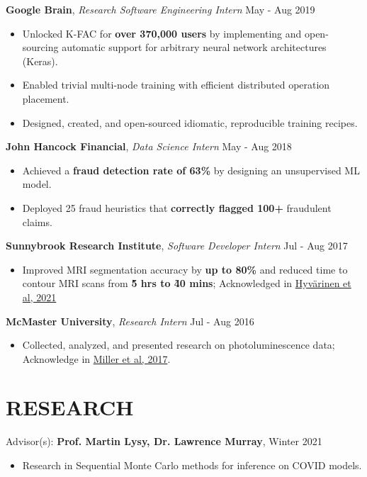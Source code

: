 \documentclass[line,margin]{res}
\newcommand{\experience}[3]{\textbf{#1}, \textit{#2} \hfill #3 \\ \vspace{-4mm}}
\newcommand{\ura}[3]{Advisor(s): \textbf{#1}, \textit{#2} \hfill #3 \\ \vspace{-4mm}}
\begin{document}
\begin{resume}
    \experience{Google Brain}{Research Software Engineering Intern}{May - Aug 2019}
    \begin{itemize}
        \item Unlocked K-FAC for \textbf{over 370,000 users} by implementing and open-sourcing automatic support for arbitrary neural network architectures (Keras).
        \item Enabled trivial multi-node training with efficient distributed operation placement.
        \item Designed, created, and open-sourced idiomatic, reproducible training recipes.
    \end{itemize}

    \experience{John Hancock Financial}{Data Science Intern}{May - Aug 2018}
    \begin{itemize}
        \item Achieved a \textbf{fraud detection rate of 63\%} by designing an unsupervised ML model.
        \item Deployed 25 fraud heuristics that \textbf{correctly flagged 100+} fraudulent claims.
    \end{itemize}

    \experience{Sunnybrook Research Institute}{Software Developer Intern}{Jul - Aug 2017}
    \begin{itemize}
        \item Improved MRI segmentation accuracy by \textbf{up to 80\%} and reduced time to contour MRI scans from \textbf{\~5 hrs to \~40 mins}; Acknowledged in \href{https://aapm.onlinelibrary.wiley.com/doi/epdf/10.1002/mp.15263}{Hyvärinen et al, 2021}
    \end{itemize}

    \experience{McMaster University}{Research Intern}{Jul - Aug 2016}
    \begin{itemize}
        \item Collected, analyzed, and presented research on photoluminescence data; Acknowledge in \href{https://www.bradleyresearchgroup.ca/publications.html#:~:text=J.%20W.%20Miller%2C%20D,Photonics%20North%2C%20paper%2015.20.}{Miller et al, 2017}.
    \end{itemize}

\section{RESEARCH}
    \ura{Prof. Martin Lysy, Dr. Lawrence Murray}{}{Winter 2021}
    \begin{itemize}
        \item Research in Sequential Monte Carlo methods for inference on COVID models.
    \end{itemize}
    \vspace{-2mm}


\end{resume}
\end{document}
